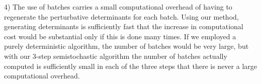 \documentclass[%
reprint,
 superscriptaddress,
 amsmath,amssymb,
 aps,
]{revtex4-1}
\begin{document}
4) The use of batches carries a small computational overhead of having to regenerate the
perturbative determinants for each batch.  Using our method, generating determinants is sufficiently fast that the
increase in computational cost would be substantial only if this is done many times.  If we employed a purely
deterministic algorithm, the number of batches would be very large, but with our 3-step semistochastic algorithm
the number of batches actually computed is sufficiently small in each of the three steps that there is never a large computational overhead.

\end{document}
